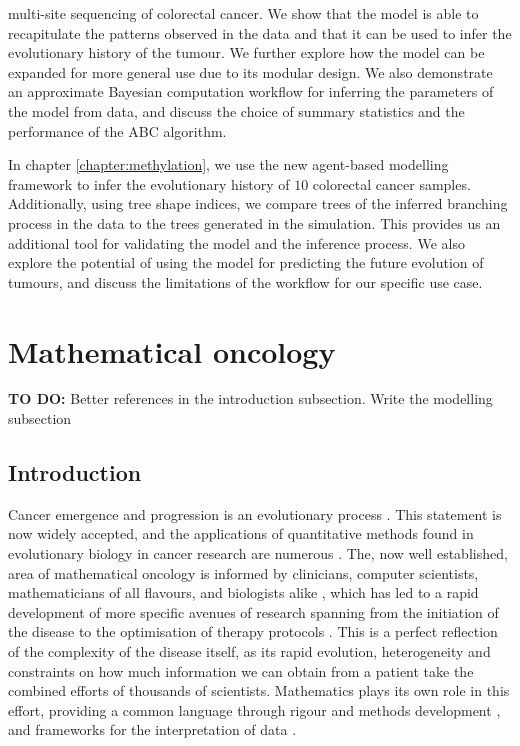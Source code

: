 multi-site sequencing of colorectal cancer. We show that the model is able to recapitulate the patterns observed in the
data and that it can be used to infer the evolutionary history of the tumour. We further explore how the model can be expanded
for more general use due to its modular design. We also demonstrate an approximate Bayesian computation workflow for inferring
the parameters of the model from data, and discuss the choice of summary statistics and the performance of the ABC algorithm.\par
In chapter \ref{chapter:methylation}, we use the new agent-based modelling framework to infer the evolutionary history of
$10$ colorectal cancer samples. Additionally, using tree shape indices, we compare trees of the inferred branching process in the data to the trees
generated in the simulation. This provides us an additional tool for validating the model and the inference process. We also
explore the potential of using the model for predicting the future evolution of tumours, and discuss the limitations of the
workflow for our specific use case.\par


\section{Mathematical oncology}
\textbf{TO DO:} Better references in the introduction subsection. Write the modelling subsection
\subsection{Introduction}
Cancer emergence and progression is an evolutionary process \cite{nowell_clonal_1976, merlo_cancer_2006}.
This statement is now widely accepted, and the applications of quantitative methods found in evolutionary
biology in cancer research are numerous \cite{rockne_2019_2019, yin_review_2019, kourou_applied_2021}.
The, now well established, area of mathematical oncology is informed by clinicians, computer scientists,
mathematicians of all flavours, and biologists alike \cite{bull_hallmarks_2022}, which has led to a rapid
development of more specific avenues of research spanning from the initiation of the disease
\cite{paterson_mathematical_2020} to the optimisation of therapy protocols
\cite{west_survey_2023}. This is a perfect reflection of the complexity
of the disease itself, as its rapid evolution, heterogeneity and constraints on
how much information we can obtain from a patient take
the combined efforts of thousands of scientists. Mathematics plays its own role in this effort, providing
a common language through rigour and methods development \cite{},
and frameworks for the interpretation of data \cite{}.

